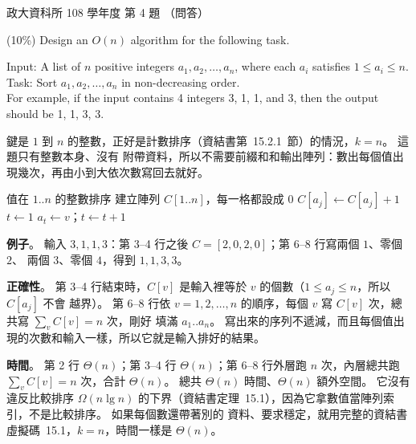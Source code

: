 \begin{pastexam}[label={px:nccu-108-dsa-04}]{政大資科所 108 學年度 第 4 題}
（問答）

(10\%) Design an $O(n)$ algorithm for the following task.

\quad Input: A list of $n$ positive integers $a_1,a_2,\ldots,a_n$, where each $a_i$ satisfies
$1\le a_i\le n$.\\
\quad Task: Sort $a_1,a_2,\ldots,a_n$ in non-decreasing order.\\
\quad For example, if the input contains 4 integers 3, 1, 1, and 3, then the output should be 1, 1,
3, 3.
\end{pastexam}

\begin{pastsoln}
鍵是 $1$ 到 $n$ 的整數，正好是計數排序（資結書第~15.2.1~節）的情況，$k = n$。 這題只有整數本身、沒有
附帶資料，所以不需要前綴和和輸出陣列：數出每個值出現幾次，再由小到大依次數寫回去就好。

\begin{pseudo}[unbreakable]{值在 $1..n$ 的整數排序}
    \State 建立陣列 $C[1..n]$，每一格都設成 $0$
        \State $C[a_j] \gets C[a_j] + 1$
    \EndFor
    \State $t \gets 1$ 
            \State $a_t \gets v$；$t \gets t + 1$
        \EndFor
    \EndFor
\EndProcedure
\end{pseudo}

\textbf{例子}。 輸入 $3, 1, 1, 3$：第 3--4 行之後 $C = [2, 0, 2, 0]$；第 6--8 行寫兩個 $1$、零個 $2$、
兩個 $3$、零個 $4$，得到 $1, 1, 3, 3$。

\textbf{正確性}。 第 3--4 行結束時，$C[v]$ 是輸入裡等於 $v$ 的個數（$1 \le a_j \le n$，所以 $C[a_j]$ 不會
越界）。 第 6--8 行依 $v = 1, 2, \ldots, n$ 的順序，每個 $v$ 寫 $C[v]$ 次，總共寫 $\sum_v C[v] = n$ 次，剛好
填滿 $a_1..a_n$。 寫出來的序列不遞減，而且每個值出現的次數和輸入一樣，所以它就是輸入排好的結果。

\textbf{時間}。 第 2 行 $\Theta(n)$；第 3--4 行 $\Theta(n)$；第 6--8 行外層跑 $n$ 次，內層總共跑
$\sum_v C[v] = n$ 次，合計 $\Theta(n)$。 總共 $\Theta(n)$ 時間、$\Theta(n)$ 額外空間。 它沒有違反比較排序
$\Omega(n \lg n)$ 的下界（資結書定理~15.1），因為它拿數值當陣列索引，不是比較排序。 如果每個數還帶著別的
資料、要求穩定，就用完整的資結書虛擬碼~15.1，$k = n$，時間一樣是 $\Theta(n)$。
\end{pastsoln}
